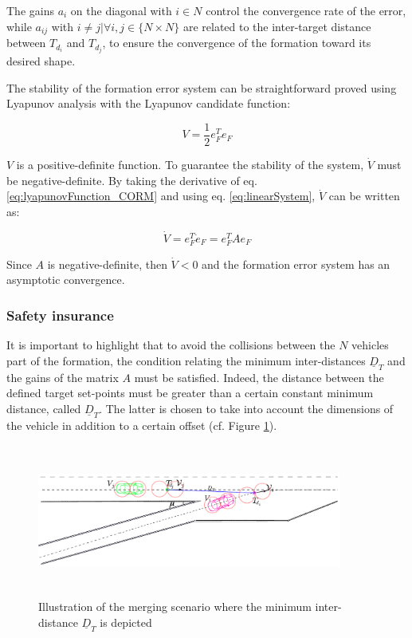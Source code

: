 The gains $a_{i}$ on the diagonal with $ i\in N $ control the convergence rate of the error, while  $a_{ij}$ with $i\neq j | \forall i,j\in \{N\times N\}$ are related to the inter-target distance between $T_{d_{i}}$ and $T_{d_{j}}$, to ensure the convergence of the formation toward its desired shape. 


The stability of the formation error system can be straightforward proved using Lyapunov analysis with the Lyapunov candidate function: 

\begin{equation}\label{eq:lyapunovFunction_CORM}
    V=\frac{1}{2}e_F^Te_F
\end{equation}

$V$ is a positive-definite function. To guarantee the stability of the system, $\dot{V}$ must be negative-definite. By taking the derivative of eq. \ref{eq:lyapunovFunction_CORM} and using eq. \ref{eq:linearSystem}, $\dot{V}$ can be written as: 

\begin{equation}\label{eq:derivativeLyapuniov_CORM}
    \dot{V}=e_F^T\dot{e}_F=e_F^TAe_F
\end{equation}

Since $A$ is negative-definite, then $\dot{V}<0$ and the formation error system has an asymptotic convergence. 

\subsubsection*{Safety insurance}


It is important to highlight that to avoid the collisions between the $N$ vehicles part of the formation, the condition relating the minimum inter-distances $\underline{D}_{T}$ and the gains of the matrix $A$ must be satisfied. Indeed, the distance between the defined target set-points must be greater than a certain constant minimum distance, called $\underline{D}_{T}$. The latter is chosen to take into account the dimensions of the vehicle in addition to a certain offset (cf. Figure \ref{fig:safetydistance}). 


       \begin{figure}[!h]
        \centering 
        \includegraphics[width=10cm,height=5cm]{chapters/Chapitre_5/Figures/safety_distance.pdf}
        \caption{Illustration of the merging scenario where the minimum inter-distance $\underline{D}_{T}$ is depicted}
        \label{fig:safetydistance}
        \end{figure}




